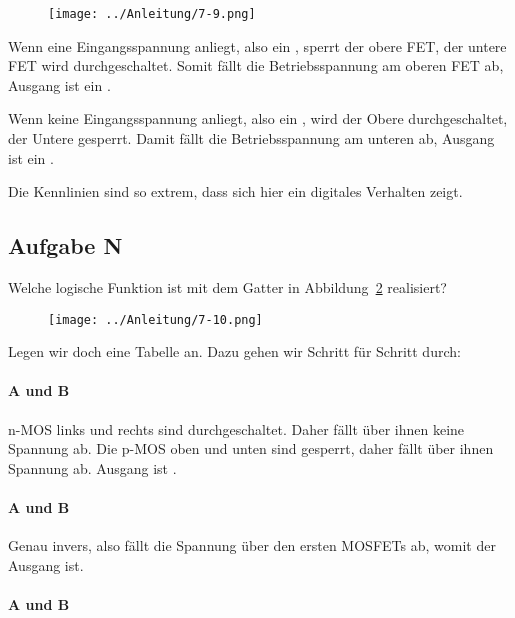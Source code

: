 \begin{figure}[htbp]
	\centering
	\texttt{[image: ../Anleitung/7-9.png]}
	\caption{%
		\cite[Abbildung~7.9]{physik313-Anleitung}
	}
	\label{fig:7-9}
\end{figure}

Wenn eine Eingangsspannung anliegt, also ein \thigh, sperrt der obere FET, der
untere FET wird durchgeschaltet. Somit fällt die Betriebsspannung am oberen FET
ab, Ausgang ist ein \tlow.

Wenn keine Eingangsspannung anliegt, also ein \tlow, wird der Obere
durchgeschaltet, der Untere gesperrt. Damit fällt die Betriebsspannung am
unteren ab, Ausgang ist ein \thigh.

Die Kennlinien sind so extrem, dass sich hier ein digitales Verhalten zeigt.

\FloatBarrier
\subsection{Aufgabe N}

\begin{problem}
	Welche logische Funktion ist mit dem Gatter in Abbildung~\ref{fig:7-10}
	realisiert?
\end{problem}

\begin{figure}[htbp]
	\centering
	\texttt{[image: ../Anleitung/7-10.png]}
	\caption{%
		\cite[Abbildung~7.10]{physik313-Anleitung}
	}
	\label{fig:7-10}
\end{figure}

Legen wir doch eine Tabelle an. Dazu gehen wir Schritt für Schritt durch:

\paragraph{A und B \tlow}

n-MOS links und rechts sind durchgeschaltet. Daher fällt über ihnen keine
Spannung ab. Die p-MOS oben und unten sind gesperrt, daher fällt über ihnen
Spannung ab. Ausgang ist \thigh.

\paragraph{A und B \thigh}

Genau invers, also fällt die Spannung über den ersten MOSFETs ab, womit der
Ausgang \tlow ist.

\paragraph{A \thigh{} und B \tlow}

